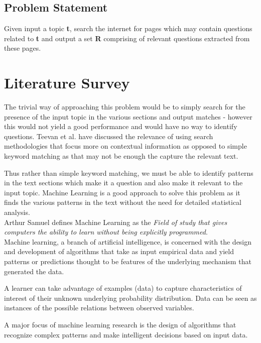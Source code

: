 \documentclass[10pt,a4paper]{report}
\begin{document}
\section{Problem Statement}

Given input a topic \textbf{t}, search the internet for pages which may contain questions related to \textbf{t} and output a set \textbf{R} comprising of relevant questions extracted from these pages.


\chapter{Literature Survey}

The trivial way of approaching this problem would be to simply search for the presence of the input topic in the various sections and output matches - however this would not yield a good performance and would have no way to identify questions. Teevan et al.\cite{teevan} have discussed the relevance of using search methodologies that focus more on contextual information as opposed to simple keyword matching as that may not be enough the capture the relevant text. 

Thus rather than simple keyword matching, we must be able to identify patterns in the text sections which make it a question and also make it relevant to the input topic. Machine Learning is a good approach to solve this problem as it finds the various patterns in the text without the need for detailed statistical analysis. \\

Arthur Samuel defines Machine Learning as the \textit{Field of study that gives computers the ability to learn without being explicitly programmed}. \\

Machine learning, a branch of artificial intelligence, is concerned with the design and development of algorithms that take as input empirical data and yield patterns or predictions thought to be features of the underlying mechanism that generated the data.

A learner can take advantage of examples (data) to capture characteristics of interest of their unknown underlying probability distribution. Data can be seen as instances of the possible relations between observed variables.

A major focus of machine learning research is the design of algorithms that recognize complex patterns and make intelligent decisions based on input data.\cite{wikiML} \\
\end{document}
